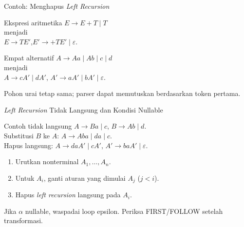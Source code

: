 \documentclass[aspectratio=169,10pt,t]{beamer}
\begin{document}
\begin{frame}{Contoh: Menghapus \textit{Left Recursion}}
  \begin{exampleblock}{Ekspresi aritmetika}
    \small
    \(E \to E+T \mid T\)\\
    menjadi\\
    \(E \to T E'\),\qquad \(E' \to +T E' \mid \varepsilon\).
  \end{exampleblock}

  \begin{exampleblock}{Empat alternatif}
    \small
    \(A \to Aa \mid Ab \mid c \mid d\)\\
    menjadi\\
    \(A \to cA' \mid dA'\),\qquad
    \(A' \to aA' \mid bA' \mid \varepsilon\).
  \end{exampleblock}

  \vspace{2pt}
  {\footnotesize Pohon urai tetap sama; parser dapat memutuskan
  berdasarkan token pertama.}
\end{frame}

\begin{frame}{\textit{Left Recursion} Tidak Langsung dan Kondisi Nullable}
  \begin{block}{Contoh tidak langsung}
    \footnotesize
    \(A \to Ba \mid c\), \(B \to Ab \mid d\).\\
    Substitusi \(B\) ke \(A\): \(A \to Aba \mid da \mid c\).\\
    Hapus langsung: \(A \to daA' \mid cA'\),
    \(A' \to baA' \mid \varepsilon\).
  \end{block}

  \begin{enumerate}
    \setlength{\itemsep}{1pt}
    \item Urutkan nonterminal \(A_1,\ldots,A_n\).
    \item Untuk \(A_i\), ganti aturan yang dimulai \(A_j\) (\(j<i\)).
    \item Hapus \textit{left recursion} langsung pada \(A_i\).
  \end{enumerate}

  \vspace{2pt}
  {\footnotesize\color{ubbblue!80}Jika \(\alpha\) nullable, waspadai
  loop epsilon. Periksa FIRST/FOLLOW setelah transformasi.}
\end{frame}
\end{document}

